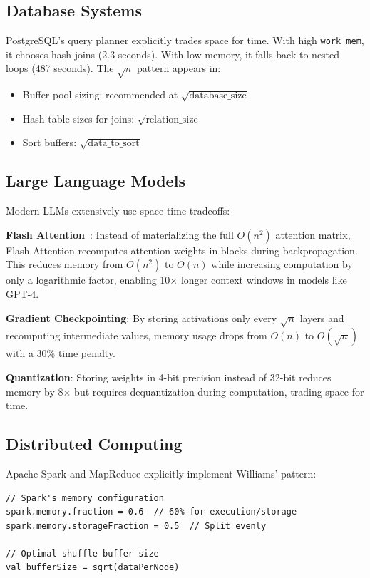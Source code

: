 \documentclass[11pt]{article}
\theoremstyle{definition}
\begin{document}
\subsection{Database Systems}

PostgreSQL's query planner explicitly trades space for time. With high \texttt{work\_mem}, it chooses hash joins (2.3 seconds). With low memory, it falls back to nested loops (487 seconds). The $\sqrt{n}$ pattern appears in:
\begin{itemize}
\item Buffer pool sizing: recommended at $\sqrt{\text{database\_size}}$
\item Hash table sizes for joins: $\sqrt{\text{relation\_size}}$
\item Sort buffers: $\sqrt{\text{data\_to\_sort}}$
\end{itemize}

\subsection{Large Language Models}

Modern LLMs extensively use space-time tradeoffs:

\textbf{Flash Attention}~\cite{flashattention2022}: Instead of materializing the full $O(n^2)$ attention matrix, Flash Attention recomputes attention weights in blocks during backpropagation. This reduces memory from $O(n^2)$ to $O(n)$ while increasing computation by only a logarithmic factor, enabling 10$\times$ longer context windows in models like GPT-4.

\textbf{Gradient Checkpointing}: By storing activations only every $\sqrt{n}$ layers and recomputing intermediate values, memory usage drops from $O(n)$ to $O(\sqrt{n})$ with a 30\% time penalty.

\textbf{Quantization}: Storing weights in 4-bit precision instead of 32-bit reduces memory by 8$\times$ but requires dequantization during computation, trading space for time.

\subsection{Distributed Computing}

Apache Spark and MapReduce explicitly implement Williams' pattern:

\begin{verbatim}
// Spark's memory configuration
spark.memory.fraction = 0.6  // 60% for execution/storage
spark.memory.storageFraction = 0.5  // Split evenly

// Optimal shuffle buffer size
val bufferSize = sqrt(dataPerNode)
\end{verbatim}
\end{document}
